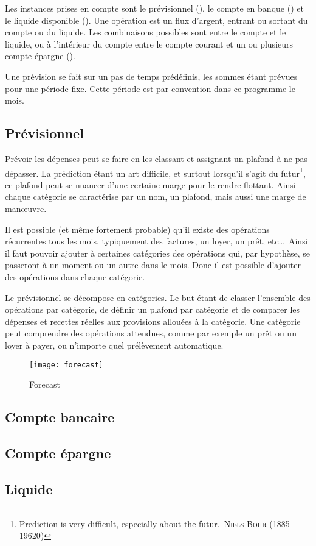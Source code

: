 Les instances prises en compte sont le prévisionnel
(\forecast), le compte en banque (\bank) et le 
liquide disponible (\liquid). Une opération est un flux d'argent, 
entrant ou sortant du compte ou du liquide. Les combinaisons possibles 
sont entre le compte et le liquide, ou à l'intérieur du compte entre le 
compte courant et un ou plusieurs compte-épargne (\saving).

Une prévision se fait sur un pas de temps prédéfinis, les sommes
étant prévues pour une période fixe. Cette période est par convention
dans ce programme le mois.

\subsection{Prévisionnel}

Prévoir les dépenses peut se faire en les classant et assignant
un plafond à ne pas dépasser. La prédiction étant un art difficile,
et surtout lorsqu'il s'agit du futur\footnote{\og Prediction is very
difficult, especially about the futur.\fg\ \textsc{Niels Bohr}
(1885--19620)}, ce plafond peut se nuancer d'une certaine marge
pour le rendre flottant.
Ainsi chaque catégorie se caractérise par un nom, un plafond, mais
aussi une marge de man\oe uvre.

Il est possible (et même fortement probable) qu'il existe des
opérations récurrentes tous les mois, typiquement des factures, 
un loyer, un prêt, etc\dots\ Ainsi il faut pouvoir ajouter
à certaines catégories des opérations qui, par hypothèse,
se passeront à un moment ou un autre dans le mois.
Donc il est possible d'ajouter des opérations dans chaque
catégorie.

Le prévisionnel se décompose en catégories. Le but étant de classer 
l'ensemble des opérations par catégorie, de définir un plafond par 
catégorie et de comparer les dépenses et recettes réelles aux 
provisions allouées à la catégorie. Une catégorie peut comprendre 
des opérations attendues, comme par exemple un prêt ou un loyer à 
payer, ou n'importe quel prélèvement automatique.

\begin{figure}[htp]
\centering
\texttt{[image: forecast]}
\caption{\label{forecast}Forecast}
\end{figure}

\subsection{Compte bancaire}
\subsection{Compte épargne}
\subsection{Liquide}

